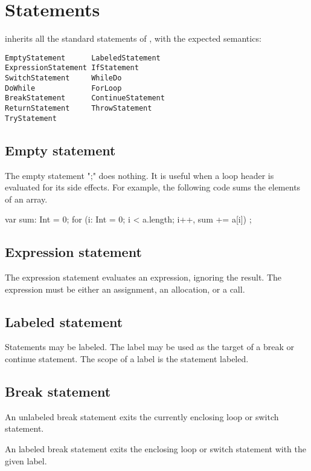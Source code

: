\chapter{Statements}\label{XtenStatements}

\Xten{} inherits all the standard statements of \Java{}, with the expected semantics:

\begin{verbatim}
EmptyStatement      LabeledStatement  
ExpressionStatement IfStatement
SwitchStatement     WhileDo
DoWhile             ForLoop           
BreakStatement      ContinueStatement  
ReturnStatement     ThrowStatement
TryStatement
\end{verbatim}

\section{Empty statement}

The empty statement \xcd";" does nothing.  It is useful when a
loop header is evaluated for its side effects.  For example,
the following code sums the elements of an array.
\begin{xten}
var sum: Int = 0;
for (i: Int = 0; i < a.length; i++, sum += a[i])
    ;
\end{xten}

\section{Expression statement}

The expression statement evaluates an expression, ignoring the
result.  The expression must be either an assignment, an
allocation, or a call.

\section{Labeled statement}

Statements may be labeled.  The label may be used as the target
of a break or continue statement.  The scope of a label is the
statement labeled.

\section{Break statement}

An unlabeled break statement exits the currently enclosing loop
or switch statement.

An labeled break statement exits the enclosing loop
or switch statement with the given label.

